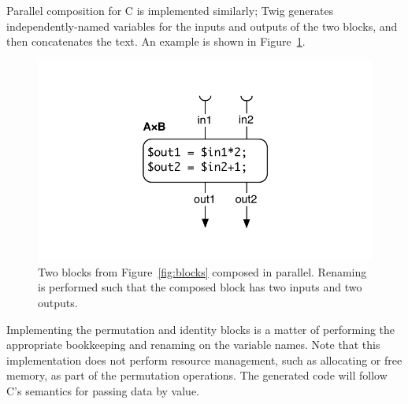 Parallel composition for C is implemented similarly; Twig
generates independently-named variables for the inputs and outputs
of the two blocks, and then concatenates the text. An example is
shown in Figure~\ref{fig:codegen-par}.

\begin{figure}[ht]
\centering
\includegraphics[width=0.75\columnwidth]{images/code-gen3}
\caption{Two blocks from Figure~\ref{fig:blocks} composed in 
parallel. Renaming is performed such that the composed block has 
two inputs and two outputs.}
\label{fig:codegen-par}
\end{figure}

Implementing the permutation and identity blocks is a matter of
performing the appropriate bookkeeping and renaming on the
variable names. Note that this implementation does not perform
resource management, such as allocating or free memory, as part of
the permutation operations. The generated code will follow C's
semantics for passing data by value.
